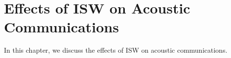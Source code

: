
\chapter{Effects of ISW on Acoustic Communications}
In this chapter, we discuss the effects of ISW on acoustic
communications.
